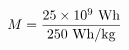 \documentclass[preview]{standalone}
\begin{document}
\begin{align*}
\special{dvisvgm:raw <g id='unique000'>}M = \frac{25\times10^9\ \mathrm{Wh}}{250\ \mathrm{Wh/kg}}\special{dvisvgm:raw </g>}
\end{align*}
\end{document}
